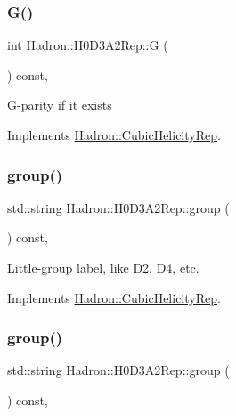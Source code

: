 \subsubsection{\texorpdfstring{G()}{G()}\hspace{0.1cm}{\footnotesize\ttfamily [3/3]}}
{\footnotesize\ttfamily int Hadron\+::\+H0\+D3\+A2\+Rep\+::G (\begin{DoxyParamCaption}{ }\end{DoxyParamCaption}) const\hspace{0.3cm}{\ttfamily [inline]}, {\ttfamily [virtual]}}

G-\/parity if it exists 

Implements \mbox{\hyperlink{structHadron_1_1CubicHelicityRep_a50689f42be1e6170aa8cf6ad0597018b}{Hadron\+::\+Cubic\+Helicity\+Rep}}.

\mbox{\label{structHadron_1_1H0D3A2Rep_a456caa07466fd0a9ea5901d4aeb23e13}} 
\subsubsection{\texorpdfstring{group()}{group()}\hspace{0.1cm}{\footnotesize\ttfamily [1/5]}}
{\footnotesize\ttfamily std\+::string Hadron\+::\+H0\+D3\+A2\+Rep\+::group (\begin{DoxyParamCaption}{ }\end{DoxyParamCaption}) const\hspace{0.3cm}{\ttfamily [inline]}, {\ttfamily [virtual]}}

Little-\/group label, like D2, D4, etc. 

Implements \mbox{\hyperlink{structHadron_1_1CubicHelicityRep_a101a7d76cd8ccdad0f272db44b766113}{Hadron\+::\+Cubic\+Helicity\+Rep}}.

\mbox{\label{structHadron_1_1H0D3A2Rep_a456caa07466fd0a9ea5901d4aeb23e13}} 
\subsubsection{\texorpdfstring{group()}{group()}\hspace{0.1cm}{\footnotesize\ttfamily [2/5]}}
{\footnotesize\ttfamily std\+::string Hadron\+::\+H0\+D3\+A2\+Rep\+::group (\begin{DoxyParamCaption}{ }\end{DoxyParamCaption}) const\hspace{0.3cm}{\ttfamily [inline]}, {\ttfamily [virtual]}}

